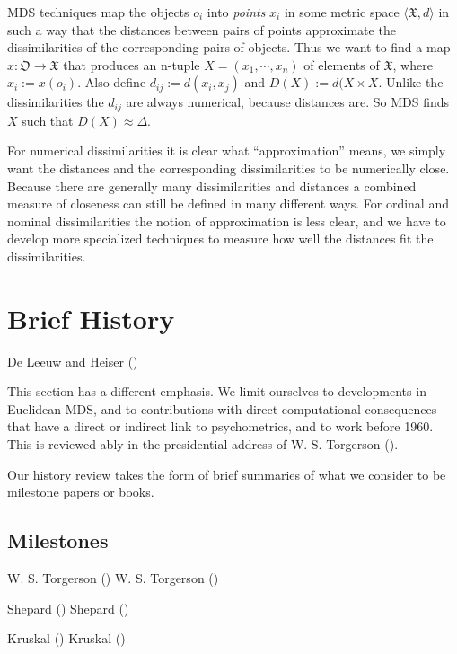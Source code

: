 \documentclass[
  12pt,
  letterpaper,
  DIV=11,
  numbers=noendperiod]{scrreprt}
\theoremstyle{remark}
\begin{document}
MDS techniques map the objects \(o_i\) into \emph{points} \(x_i\) in
some metric space \(\langle\mathfrak{X},d\rangle\) in such a way that
the distances between pairs of points approximate the dissimilarities of
the corresponding pairs of objects. Thus we want to find a map
\(x:\mathfrak{O}\rightarrow\mathfrak{X}\) that produces an n-tuple
\(X=(x_1,\cdots,x_n)\) of elements of \(\mathfrak{X}\), where
\(x_i:=x(o_i)\). Also define \(d_{ij}:=d(x_i,x_j)\) and
\(D(X):=d(X\times X\). Unlike the dissimilarities the \(d_{ij}\) are
always numerical, because distances are. So MDS finds \(X\) such that
\(D(X)\approx\Delta\).

For numerical dissimilarities it is clear what ``approximation'' means,
we simply want the distances and the corresponding dissimilarities to be
numerically close. Because there are generally many dissimilarities and
distances a combined measure of closeness can still be defined in many
different ways. For ordinal and nominal dissimilarities the notion of
approximation is less clear, and we have to develop more specialized
techniques to measure how well the distances fit the dissimilarities.

\section{Brief History}\label{introhist}

De Leeuw and Heiser ()

This section has a different emphasis. We limit ourselves to
developments in Euclidean MDS, and to contributions with direct
computational consequences that have a direct or indirect link to
psychometrics, and to work before 1960. This is reviewed ably in the
presidential address of W. S. Torgerson
().

Our history review takes the form of brief summaries of what we consider
to be milestone papers or books.

\subsection{Milestones}\label{milestones}

W. S. Torgerson () W. S. Torgerson
()

Shepard () Shepard
()

Kruskal () Kruskal
()
\end{document}
